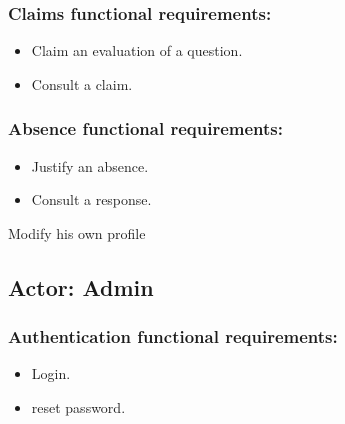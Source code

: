 \documentclass[a4paper,12p]{article}
\begin{document}
     \subsubsection{Claims functional requirements:}
     \begin{itemize}
        \item Claim an evaluation of a question.
        \item Consult a claim.
     \end{itemize}

     \subsubsection{Absence functional requirements:}
     \begin{itemize}
         \item Justify an absence.
         \item Consult a response.
     \end{itemize}

     \item Modify his own profile


     \subsection{Actor: Admin}
     \subsubsection{Authentication functional requirements:}
     \begin{itemize}
         \item Login.
         \item reset password.
     \end{itemize}
\end{document}
